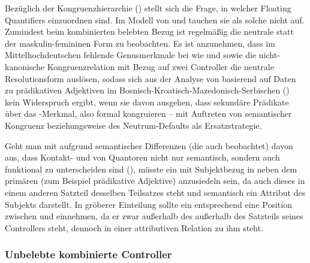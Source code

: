 Bezüglich der Kongruenzhierarchie
() stellt sich die Frage, in welcher 
Floating Quantifiers einzuordnen sind. Im Modell von
\citet{corbett1979} und \citet[84]{wechslerzlatic2003} tauchen sie als solche
nicht auf. Zumindest beim kombinierten belebten Bezug ist regelmäßig die
neutrale statt der maskulin-\allowbreak{}femi\-ninen Form zu beobachten. Es ist
anzunehmen, dass im Mittelhochdeutschen fehlende
Genusmerkmale bei  wie  und
 sowie die nicht-kanonische
Kongruenzrelation mit Bezug auf zwei
Controller die neutrale Resolutionsform auslösen, sodass sich aus der Analyse
von \citet[54--55, 84]{wechslerzlatic2003} basierend auf Daten zu prädikativen
Adjektiven im
Bos\-nisch-\allowbreak{}Kroa\-tisch-\allowbreak{}Maze\-donisch-\allowbreak{}Ser\-bischen
() kein Widerspruch ergibt, wenn sie davon ausgehen, dass sekundäre
Prädikate über das -Merkmal, also formal
kongruieren -- mit
Auftreten von semantischer Kongruenz beziehungsweise
des Neutrum-Defaults als Ersatzstrategie.

Geht man mit \citet{spector2009} aufgrund semantischer Differenzen (die auch
\cite{pittner1995} beobachtet) davon aus, dass Kontakt- und
 von Quantoren nicht nur semantisch, sondern auch
funktional zu unterscheiden sind (), müsste ein
 mit Subjektbezug in  neben
dem primären  (zum Beispiel prädikative
Adjektive) anzusiedeln sein, da auch dieses in einem
anderen Satzteil desselben Teilsatzes steht und semantisch ein
Attribut des Subjekts darstellt. In
 gröberer Einteilung sollte ein
 entsprechend eine Position zwischen
 und  einnehmen, da er zwar außerhalb des
außerhalb des Satzteils seines Controllers steht, dennoch in einer
attributiven Relation zu ihm steht.


\subsubsection{Unbelebte kombinierte Controller}

